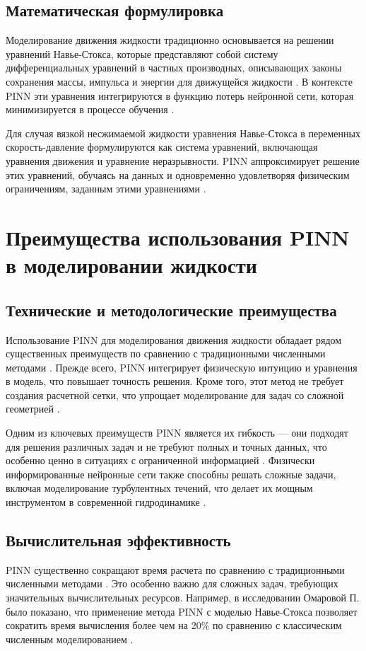 \subsection{Математическая формулировка}
Моделирование движения жидкости традиционно основывается на решении уравнений Навье-Стокса, которые
представляют собой систему дифференциальных уравнений в частных производных, описывающих законы сохранения
массы, импульса и энергии для движущейся жидкости \cite{batchelor2000introduction}. В контексте PINN эти
уравнения интегрируются в функцию потерь нейронной сети, которая минимизируется в процессе
обучения \cite{yang2019adversarial}.

Для случая вязкой несжимаемой жидкости уравнения Навье-Стокса в переменных скорость-давление формулируются
как система уравнений, включающая уравнения движения и уравнение неразрывности. PINN аппроксимирует
решение этих уравнений, обучаясь на данных и одновременно удовлетворяя физическим ограничениям, заданным
этими уравнениями \cite{jin2021nsfnets}.

\section{Преимущества использования PINN в моделировании жидкости}
\subsection{Технические и методологические преимущества}
Использование PINN для моделирования движения жидкости обладает рядом существенных преимуществ по сравнению
с традиционными численными методами \cite{cuomo2022scientific}. Прежде всего, PINN интегрирует физическую
интуицию и уравнения в модель, что повышает точность решения. Кроме того, этот метод не требует создания
расчетной сетки, что упрощает моделирование для задач со сложной геометрией \cite{cai2021physics}.

Одним из ключевых преимуществ PINN является их гибкость –-- они подходят для решения различных задач и
не требуют полных и точных данных, что особенно ценно в ситуациях с ограниченной
информацией \cite{karniadakis2021physics}. Физически информированные нейронные сети также способны решать
сложные задачи, включая моделирование турбулентных течений, что делает их мощным инструментом в современной
гидродинамике \cite{mao2020physics}.

\subsection{Вычислительная эффективность}
PINN существенно сокращают время расчета по сравнению с традиционными численными
методами \cite{jagtap2020conservative}. Это особенно важно для сложных задач, требующих значительных вычислительных
ресурсов. Например, в исследовании Омаровой П. было показано, что применение метода PINN с моделью Навье-Стокса
позволяет сократить время вычисления более чем на 20\% по сравнению с классическим численным
моделированием \cite{omarova2022pinn}.

